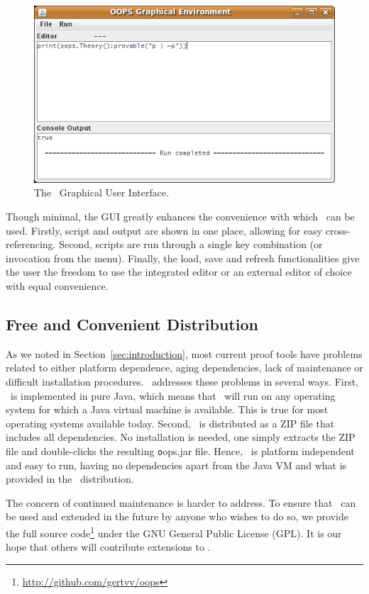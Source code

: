 \begin{figure}
\centering
\includegraphics[scale=.50]{images/gui}
\caption{The \oops\ Graphical User Interface.}
\label{fig:gui}
\end{figure}

Though minimal, the GUI greatly enhances the convenience with which \oops\ can
be used. Firstly, script and output are shown in one place, allowing for easy
cross-referencing. Second, scripts are run through a single key combination
(or invocation from the menu). Finally, the load, save and refresh functionalities
give the user the freedom to use the integrated editor or an external editor
of choice with equal convenience.

\subsection{Free and Convenient Distribution}

As we noted in Section~\ref{sec:introduction}, most current proof tools have
problems related to either platform dependence, aging dependencies, lack of
maintenance or difficult installation procedures. \oops\ addresses these
problems in several ways.
First, \oops\ is implemented in pure Java, which means that \oops\ will run on
any operating system for which a Java virtual machine is available. This is
true for most operating systems available today.
Second, \oops\ is distributed as a ZIP file that includes all dependencies.
No installation is needed, one simply extracts the ZIP file and double-clicks
the resulting {\texttt oops.jar} file.
Hence, \oops\ is platform independent and easy to run, having no dependencies
apart from the Java VM and what is provided in the \oops\ distribution.

The concern of continued maintenance is harder to address. To ensure that
\oops\ can be used and extended in the future by anyone who wishes to do so,
we provide the full source code\footnote{\url{http://github.com/gertvv/oops}} under
the GNU General Public License (GPL). It is our hope that others will
contribute extensions to \oops.

